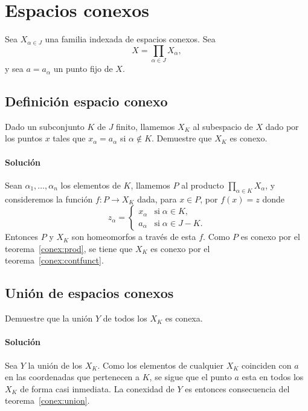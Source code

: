 \documentclass[a5paper,10pt,final]{extarticle}
\let\footnote\null
\begin{document}
\section{Espacios conexos}\label{sec:conexo}

Sea $X_{\alpha\in J}$ una familia indexada de espacios conexos. Sea
\[
X=\prod_{\alpha\in J} X_\alpha,
\]
y sea $a=a_\alpha$ un punto fijo de $X$.\footnote{Tomado del Munkres \cite[\S23, Nº 10]{munkres_topology_2014}}

\subsection{Definición espacio conexo}

Dado un subconjunto $K$ de $J$ finito, llamemos $X_K$ al subespacio de $X$ dado por los puntos
$x$ tales que $x_\alpha=a_\alpha$ si $\alpha\not\in K$. Demuestre que $X_K$ es conexo.

\paragraph{Solución}
Sean $\alpha_1,\dots,\alpha_n$ los elementos de $K$, llamemos $P$ al producto $\prod_{\alpha\in K}X_\alpha$,
y consideremos la función 
$f:P\to X_K$ dada, para $x\in P$, por $f(x)=z$ donde
\[
z_\alpha= \begin{cases}
	x_\alpha &\text{si}\; \alpha\in K,\\
	a_\alpha &\text{si}\; \alpha\in J-K.
\end{cases}
\]
Entonces $P$ y $X_K$ son homeomorfos a través de esta $f$. Como $P$ es conexo por
el teorema~\ref{conex:prod}, se tiene que $X_K$ es conexo por el teorema~\ref{conex:contfunct}.

\subsection{Unión de espacios conexos}

Demuestre que la unión $Y$ de todos los $X_K$ es conexa.

\paragraph{Solución}
Sea $Y$ la unión de los $X_K$. Como los elementos de cualquier $X_K$ coinciden con
$a$ en las coordenadas que pertenecen a $K$, se sigue que el punto $a$ esta en
todos los $X_K$ de forma casi inmediata. La conexidad de $Y$ es entonces consecuencia del
teorema~\ref{conex:union}.
\end{document}
